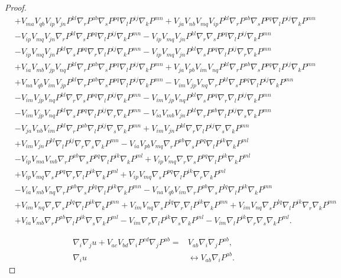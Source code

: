 \documentclass{amsart}
\theoremstyle{definition}
\theoremstyle{remark}
\numberwithin{equation}{section}
\begin{document}
\begin{proof}
\begin{align*}
&+V_{ma}V_{qb}V_{ip}V_{jn}P^{kl}\nabla_rP^{ab}\nabla_sP^{pq}\nabla_l P^{ij}\nabla_kP^{mn}+V_{ja}V_{nb}V_{mq}V_{ip}P^{kl}\nabla_rP^{ab}\nabla_sP^{pq}\nabla_l P^{ij}\nabla_kP^{mn}\\
&-V_{ip}V_{mq}V_{jn}\nabla_rP^{kl}\nabla_sP^{pq}\nabla_l P^{ij}\nabla_kP^{mn}-V_{ip}V_{mq}V_{jn}P^{kl}\nabla_r\nabla_sP^{pq}\nabla_l P^{ij}\nabla_kP^{mn}\\
&-V_{ip}V_{mq}V_{jn}P^{kl}\nabla_sP^{pq}\nabla_r\nabla_l P^{ij}\nabla_kP^{mn}-V_{ip}V_{mq}V_{jn}P^{kl}\nabla_sP^{pq}\nabla_l P^{ij}\nabla_r\nabla_kP^{mn}\\
&+V_{ia}V_{mb}V_{jp}V_{nq}P^{kl}\nabla_rP^{ab}\nabla_sP^{pq}\nabla_l P^{ij}\nabla_kP^{mn}+V_{ja}V_{pb}V_{im}V_{nq}P^{kl}\nabla_rP^{ab}\nabla_sP^{pq}\nabla_l P^{ij}\nabla_kP^{mn}\\
&+V_{na}V_{qb}V_{im}V_{jp}P^{kl}\nabla_rP^{ab}\nabla_sP^{pq}\nabla_l P^{ij}\nabla_kP^{mn}-V_{im}V_{jp}V_{nq}\nabla_rP^{kl}\nabla_sP^{pq}\nabla_l P^{ij}\nabla_kP^{mn}\\
&-V_{im}V_{jp}V_{nq}P^{kl}\nabla_r\nabla_sP^{pq}\nabla_l P^{ij}\nabla_kP^{mn}-V_{im}V_{jp}V_{nq}P^{kl}\nabla_sP^{pq}\nabla_r\nabla_l P^{ij}\nabla_kP^{mn}\\
&-V_{im}V_{jp}V_{nq}P^{kl}\nabla_sP^{pq}\nabla_l P^{ij}\nabla_r\nabla_kP^{mn}-V_{ia}V_{mb}V_{jn}P^{kl}\nabla_rP^{ab}\nabla_l P^{ij}\nabla_s\nabla_kP^{mn}\\
&-V_{ja}V_{nb}V_{im}P^{kl}\nabla_rP^{ab}\nabla_l P^{ij}\nabla_s\nabla_kP^{mn}+V_{im}V_{jn}P^{kl}\nabla_r\nabla_l P^{ij}\nabla_s\nabla_kP^{mn}\\
&+V_{im}V_{jn}P^{kl}\nabla_l P^{ij}\nabla_r\nabla_s\nabla_kP^{mn}-V_{ia}V_{pb}V_{mq}\nabla_rP^{ab}\nabla_sP^{pq}\nabla_lP^{ik}\nabla_kP^{ml}\\
&-V_{ip}V_{ma}V_{mb}\nabla_rP^{ab}\nabla_sP^{pq}\nabla_lP^{ik}\nabla_kP^{ml}+V_{ip}V_{mq}\nabla_r\nabla_sP^{pq}\nabla_lP^{ik}\nabla_kP^{ml}\\
&+V_{ip}V_{mq}\nabla_sP^{pq}\nabla_r\nabla_lP^{ik}\nabla_kP^{ml}+V_{ip}V_{mq}\nabla_sP^{pq}\nabla_lP^{ik}\nabla_r\nabla_kP^{ml}\\
&-V_{ia}V_{mb}V_{nq}\nabla_rP^{ab}\nabla_sP^{lq}\nabla_lP^{ik}\nabla_kP^{mn}-V_{na}V_{qb}V_{im}\nabla_rP^{ab}\nabla_sP^{lq}\nabla_lP^{ik}\nabla_kP^{mn}\\
&+V_{im}V_{nq}\nabla_r\nabla_sP^{lq}\nabla_lP^{ik}\nabla_kP^{mn}+V_{im}V_{nq}\nabla_sP^{lq}\nabla_r\nabla_lP^{ik}\nabla_kP^{mn}+V_{im}V_{nq}\nabla_sP^{lq}\nabla_lP^{ik}\nabla_r\nabla_kP^{mn}\\
&+V_{ia}V_{mb}\nabla_rP^{ab}\nabla_lP^{ik}\nabla_s\nabla_kP^{ml}-V_{im}\nabla_r\nabla_lP^{ik}\nabla_s\nabla_kP^{ml}-V_{im}\nabla_lP^{ik}\nabla_r\nabla_s\nabla_kP^{ml}.
\end{align*}

\begin{align*}
\nabla_i\nabla_ju+V_{ac}V_{bd}\nabla_iP^{cd}\nabla_jP^{ab}=& V_{ab}\nabla_i\nabla_jP^{ab},\\
\nabla_iu&\leftrightarrow V_{ab}\nabla_iP^{ab}.
\end{align*}
\end{proof}
\end{document}
